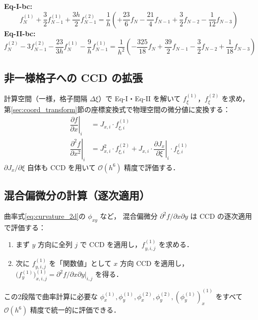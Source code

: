 \documentclass[12pt, a4paper, titlepage]{article}
\newcommand{\jp}[1]{{\normalfont\jpfont #1}}
\newcommand{\pd}[2]{\dfrac{\partial #1}{\partial #2}}
\newcommand{\pdd}[2]{\dfrac{\partial^2 #1}{\partial #2^2}}
\newcommand{\Ord}[1]{\mathcal{O}(#1)}
\newcommand{\fp}[1]{f^{(1)}_{#1}}
\newcommand{\fpp}[1]{f^{(2)}_{#1}}
\begin{document}
\begin{tcolorbox}[mybox, title={\jp{右境界スキーム（$i=N$，$\Ord{h^5}$）}}]
\label{eq:CCD_bc_right}
\textbf{Eq-I-bc:}
\begin{equation}
  \fp{N} + \frac{3}{2}\fp{N-1} + \frac{3h}{2}\fpp{N-1}
  = \frac{1}{h}\!\left(
    +\frac{23}{6}f_N
    - \frac{21}{4}f_{N-1}
    + \frac{3}{2}f_{N-2}
    - \frac{1}{12}f_{N-3}
  \right)
  \label{eq:bc_I_right}
\end{equation}
\textbf{Eq-II-bc:}
\begin{equation}
  \fpp{N} - 3\fpp{N-1}
  - \frac{23}{3h}\fp{N}
  - \frac{9}{h}\fp{N-1}
  = \frac{1}{h^2}\!\left(
    -\frac{325}{18}f_N
    + \frac{39}{2}f_{N-1}
    - \frac{3}{2}f_{N-2}
    + \frac{1}{18}f_{N-3}
  \right)
  \label{eq:bc_II_right}
\end{equation}
\end{tcolorbox}

\subsection{\jp{非一様格子への CCD の拡張}}

\jp{計算空間（一様，格子間隔 $\Delta\xi$）で Eq-I・Eq-II を解いて
$f^{(1)}_{\xi}$，$f^{(2)}_{\xi}$ を求め，
第\ref{sec:coord_transform}節の座標変換式で物理空間の微分値に変換する：}
\begin{align}
  \left.\pd{f}{x}\right|_i
    &= J_{x,i}\cdot f^{(1)}_{\xi,i}
  \label{eq:nonuniform_1st}\\[6pt]
  \left.\pdd{f}{x}\right|_i
    &= J_{x,i}^2\cdot f^{(2)}_{\xi,i}
     + J_{x,i}\cdot\left.\pd{J_x}{\xi}\right|_i \cdot f^{(1)}_{\xi,i}
  \label{eq:nonuniform_2nd}
\end{align}
\jp{$\partial J_x/\partial\xi$ 自体も CCD を用いて $\Ord{h^6}$ 精度で評価する．}

\subsection{\jp{混合偏微分の計算（逐次適用）}}

\jp{曲率式\eqref{eq:curvature_2d}の $\phi_{xy}$ など，
混合偏微分 $\partial^2 f/\partial x\partial y$ は CCD の逐次適用で評価する：}
\begin{enumerate}
  \item \jp{まず $y$ 方向に全列 $j$ で CCD を適用し，$f^{(1)}_{y,i,j}$ を求める．}
  \item \jp{次に $f^{(1)}_{y,i,j}$ を「関数値」として $x$ 方向 CCD を適用し，
        $\bigl(f^{(1)}_y\bigr)^{(1)}_{x,i,j} = \partial^2 f/\partial x\partial y|_{i,j}$ を得る．}
\end{enumerate}
\jp{この2段階で曲率計算に必要な
$\phi^{(1)}_x, \phi^{(1)}_y, \phi^{(2)}_x, \phi^{(2)}_y, (\phi^{(1)}_y)^{(1)}_x$
をすべて $\Ord{h^6}$ 精度で統一的に評価できる．}
\end{document}
